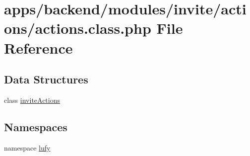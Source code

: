 \hypertarget{backend_2modules_2invite_2actions_2actions_8class_8php}{\section{apps/backend/modules/invite/actions/actions.class.\-php File Reference}
\label{backend_2modules_2invite_2actions_2actions_8class_8php}
}
\subsection*{Data Structures}
\begin{DoxyCompactItemize}
\item 
class \hyperlink{classinvite_actions}{invite\-Actions}
\end{DoxyCompactItemize}
\subsection*{Namespaces}
\begin{DoxyCompactItemize}
\item 
namespace \hyperlink{namespacelufy}{lufy}
\end{DoxyCompactItemize}
